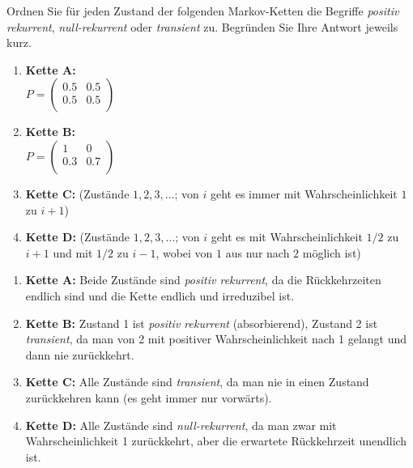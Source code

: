 \begin{mychallenge}
    Ordnen Sie für jeden Zustand der folgenden Markov-Ketten die Begriffe \emph{positiv rekurrent}, \emph{null-rekurrent} oder \emph{transient} zu. Begründen Sie Ihre Antwort jeweils kurz.

    \begin{enumerate}
        \item \textbf{Kette A:} \\
              $P = \begin{pmatrix}
                      0.5 & 0.5 \\
                      0.5  & 0.5 \\
                  \end{pmatrix}$

        \item \textbf{Kette B:} \\
              $P = \begin{pmatrix}
                      1    & 0    \\
                      0.3 & 0.7 \\
                  \end{pmatrix}$

        \item \textbf{Kette C:} (Zustände $1,2,3,\ldots$; von $i$ geht es immer mit Wahrscheinlichkeit $1$ zu $i+1$)

        \item \textbf{Kette D:} (Zustände $1,2,3,\ldots$; von $i$ geht es mit Wahrscheinlichkeit $1/2$ zu $i+1$ und mit $1/2$ zu $i-1$, wobei von $1$ aus nur nach $2$ möglich ist)
    \end{enumerate}

    \begin{myanswer}
        \begin{enumerate}
            \item \textbf{Kette A:} Beide Zustände sind \emph{positiv rekurrent}, da die Rückkehrzeiten endlich sind und die Kette endlich und irreduzibel ist.
            \item \textbf{Kette B:} Zustand 1 ist \emph{positiv rekurrent} (absorbierend), Zustand 2 ist \emph{transient}, da man von 2 mit positiver Wahrscheinlichkeit nach 1 gelangt und dann nie zurückkehrt.
            \item \textbf{Kette C:} Alle Zustände sind \emph{transient}, da man nie in einen Zustand zurückkehren kann (es geht immer nur vorwärts).
            \item \textbf{Kette D:} Alle Zustände sind \emph{null-rekurrent}, da man zwar mit Wahrscheinlichkeit 1 zurückkehrt, aber die erwartete Rückkehrzeit unendlich ist.
        \end{enumerate}
    \end{myanswer}
\end{mychallenge}

